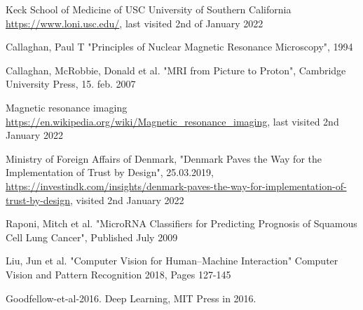 \documentclass[12pt, fleqn, titlepage]{article}
\begin{document}
\begin{thebibliography}{9}
		 Keck School of Medicine of USC University of Southern California \url{https://www.loni.usc.edu/}, last visited 2nd of January 2022
		
		 Callaghan, Paul T "Principles of Nuclear
		Magnetic Resonance Microscopy", 1994
		
		 Callaghan, McRobbie, Donald et al. "MRI from Picture to Proton", Cambridge University Press, 15. feb. 2007
		
		 Magnetic resonance imaging \url{https://en.wikipedia.org/wiki/Magnetic_resonance_imaging}, last visited 2nd January 2022
		
		 Ministry of Foreign Affairs of Denmark, "Denmark Paves the Way for the Implementation of Trust by Design", 25.03.2019, \url{https://investindk.com/insights/denmark-paves-the-way-for-implementation-of-trust-by-design}, visited 2nd January 2022
		
		 Raponi, Mitch et al. "MicroRNA Classifiers for Predicting Prognosis of Squamous Cell Lung Cancer", Published July 2009
		
		 Liu, Jun et al. "Computer Vision for Human–Machine Interaction" Computer Vision and Pattern Recognition 2018, Pages 127-145
		
		 Goodfellow-et-al-2016. Deep Learning, MIT Press in 2016.
		
			
	\end{thebibliography}
	
	
	\newpage
	
	
	
	
	
	
\end{document}
